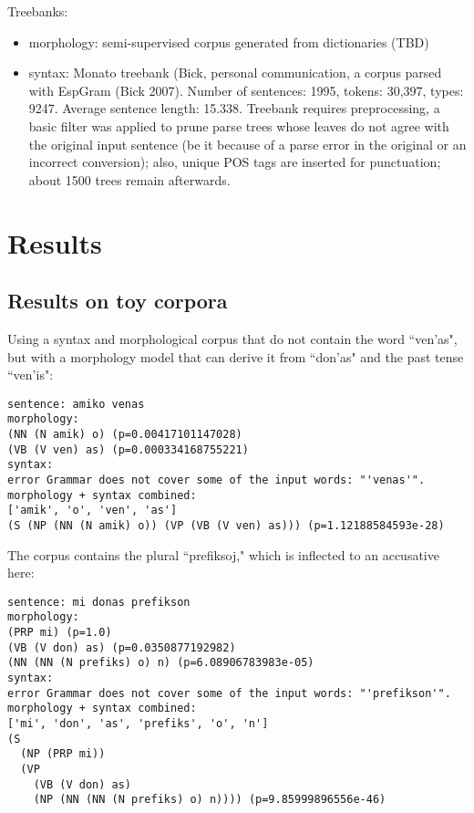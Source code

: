 \documentclass[10pt,a4paper]{article}
\begin{document}
Treebanks:

\begin{itemize}

\item morphology: semi-supervised corpus generated from dictionaries (TBD)

\item syntax: Monato treebank (Bick, personal communication, a corpus parsed
      with EspGram (Bick 2007).  Number of sentences: 1995, tokens: 30,397,
      types: 9247. Average sentence length: 15.338. Treebank requires
      preprocessing, a basic filter was applied to prune parse trees whose
      leaves do not agree with the original input sentence (be it because of a
      parse error in the original or an incorrect conversion); also, unique POS
      tags are inserted for punctuation; about 1500 trees remain afterwards.

\end{itemize}

\section{Results}

\subsection{Results on toy corpora}

Using a syntax and morphological corpus that do not contain the word ``ven'as",
but with a morphology model that can derive it from ``don'as" and the past
tense ``ven'is":

\begin{verbatim}
sentence: amiko venas
morphology:
(NN (N amik) o) (p=0.00417101147028)
(VB (V ven) as) (p=0.000334168755221)
syntax:
error Grammar does not cover some of the input words: "'venas'".
morphology + syntax combined:
['amik', 'o', 'ven', 'as']
(S (NP (NN (N amik) o)) (VP (VB (V ven) as))) (p=1.12188584593e-28)
\end{verbatim}

The corpus contains the plural ``prefiksoj," which is inflected to an accusative here:

\begin{verbatim}
sentence: mi donas prefikson
morphology:
(PRP mi) (p=1.0)
(VB (V don) as) (p=0.0350877192982)
(NN (NN (N prefiks) o) n) (p=6.08906783983e-05)
syntax:
error Grammar does not cover some of the input words: "'prefikson'".
morphology + syntax combined:
['mi', 'don', 'as', 'prefiks', 'o', 'n']
(S
  (NP (PRP mi))
  (VP
    (VB (V don) as)
    (NP (NN (NN (N prefiks) o) n)))) (p=9.85999896556e-46)
\end{verbatim}
\end{document}
